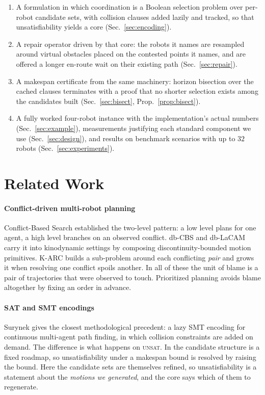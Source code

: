 \documentclass[conference]{IEEEtran}
\theoremstyle{plain}
\theoremstyle{definition}
\begin{document}
\begin{enumerate}
  \item A formulation in which coordination is a Boolean selection problem over per-robot
        candidate sets, with collision clauses added lazily and tracked, so that
        unsatisfiability yields a core (Sec.~\ref{sec:encoding}).
  \item A repair operator driven by that core: the robots it names are resampled around
        virtual obstacles placed on the contested points it names, and are offered a
        longer en-route wait on their existing path (Sec.~\ref{sec:repair}).
  \item A makespan certificate from the same machinery: horizon bisection over the cached
        clauses terminates with a proof that no shorter selection exists among the
        candidates built (Sec.~\ref{sec:bisect}, Prop.~\ref{prop:bisect}).
  \item A fully worked four-robot instance with the implementation's actual numbers
        (Sec.~\ref{sec:example}), measurements justifying each standard component we use
        (Sec.~\ref{sec:design}), and results on benchmark scenarios with up to $32$ robots
        (Sec.~\ref{sec:experiments}).
\end{enumerate}

\section{Related Work}

\paragraph*{Conflict-driven multi-robot planning}
Conflict-Based Search \cite{cbs2015} established the two-level pattern: a low level plans
for one agent, a high level branches on an observed conflict. db-CBS \cite{dbcbs2024} and
db-LaCAM \cite{dblacam2025} carry it into kinodynamic settings by composing
discontinuity-bounded motion primitives. K-ARC \cite{karc2025} builds a sub-problem around
each conflicting \emph{pair} and grows it when resolving one conflict spoils another. In all
of these the unit of blame is a pair of trajectories that were observed to touch. Prioritized
planning \cite{erdmann1987} avoids blame altogether by fixing an order in advance.

\paragraph*{SAT and SMT encodings}
Surynek \cite{surynek2020} gives the closest methodological precedent: a lazy SMT encoding
for continuous multi-agent path finding, in which collision constraints are added on demand.
The difference is what happens on \textsc{unsat}. In \cite{surynek2020} the candidate
structure is a fixed roadmap, so unsatisfiability under a makespan bound is resolved by
raising the bound. Here the candidate sets are themselves refined, so unsatisfiability is a
statement about the \emph{motions we generated}, and the core says which of them to
regenerate.
\end{document}
